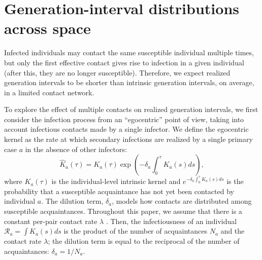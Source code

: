 \documentclass[12pt]{article}
\newcommand{\RR}{\ensuremath{{\mathcal R}}}
\begin{document}

\section{Generation-interval distributions across space}

Infected individuals may contact the same susceptible individual multiple times, but only the first effective contact gives rise to infection in a given individual (after this, they are no longer susceptible).
Therefore, we expect realized generation intervals to be shorter than intrinsic generation intervals, on average, in a limited contact network.

To explore the effect of multiple contacts on realized generation intervals, we first consider the infection process from an ``egocentric'' point of view, taking into account infectious contacts made by a single infector.
We define the egocentric kernel as the rate at which secondary infections are realized by a single primary case $a$ in the absence of other infectors:
\begin{equation}
\hat{K}_a(\tau) = K_a(\tau) \exp \left(- \delta_a \int_0^\tau K_a(s) ds\right),
\end{equation}
where $K_a(\tau)$ is the individual-level intrinsic kernel and $e^{- \delta_a \int_0^\tau K_a(s) ds}$ is the probability that a susceptible acquaintance has not yet been contacted by individual $a$.
The dilution term, $\delta_a$, models how contacts are distributed among susceptible acquaintances.
Throughout this paper, we assume that there is a constant per-pair contact rate $\lambda$ \citep{trapman2016inferring}.
Then, the infectiousness of an individual $\RR_a = \int K_a(s) ds$ is the product of the number of acquaintances $N_a$ and the contact rate $\lambda$; the dilution term is equal to the reciprocal of the number of acquaintances: $\delta_a = 1/N_a$.
\end{document}
